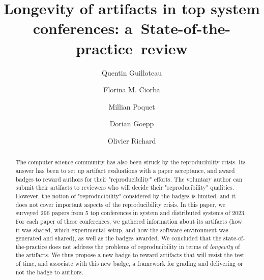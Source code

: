 \documentclass[sigconf,natbib=false]{acmart}
\begin{document}
\title{Longevity of artifacts in top system conferences: a~State-of-the-practice~review}

\author{Quentin Guilloteau}
\author{Florina M. Ciorba}

\author{Millian Poquet}

\author{Dorian Goepp}
\author{Olivier Richard}


\begin{abstract}
  The computer science community has also been struck by the reproducibility crisis.
  Its answer has been to set up artifact evaluations with a paper acceptance, and award badges to reward authors for their "reproducibility" efforts.
  The voluntary author can submit their artifacts to reviewers who will decide their "reproducibility" qualities.
  However, the notion of "reproducibility" considered by the badges is limited, and it does not cover important aspects of the reproducibility crisis.
  In this paper, we surveyed 296 papers from 5 top conferences in system and distributed systems of 2023.
  For each paper of these conferences, we gathered information about its artifacts (how it was shared, which experimental setup, and how the software environment was generated and shared), as well as the badges awarded.
  We concluded that the state-of-the-practice does not address the problems of reproducibility in terms of \emph{longevity} of the artifacts.
  We thus propose a new badge to reward artifacts that will resist the test of time, and associate with this new badge, a framework for grading and delivering or not the badge to authors.
\end{abstract}
\end{document}
